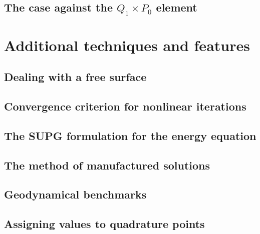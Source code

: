 \documentclass[a4paper]{article}
\begin{document}
\subsection{The case against the $Q_1\times P_0$ element}  %




\newpage
\section{Additional techniques and features} %


\subsection{Dealing with a free surface}

\subsection{Convergence criterion for nonlinear iterations}


\newpage %
\subsection{The SUPG formulation for the energy equation} \label{sec:supg}  %
\newpage %
\subsection{The method of manufactured solutions \label{mms}}  %
\newpage %
\subsection{Geodynamical benchmarks}  %
\newpage %
\subsection{Assigning values to quadrature points}  %
\newpage %
\end{document}
